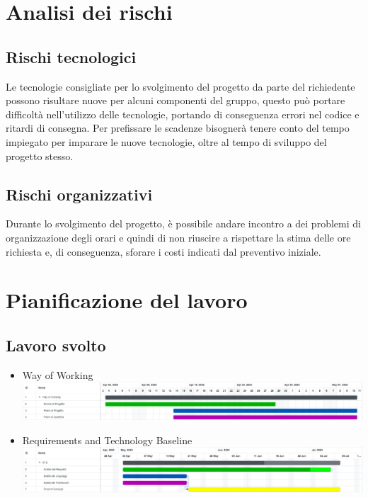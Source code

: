 \documentclass[a4paper, 12pt]{article}
\begin{document}
\makeindexdetails
\makefrontpage \makeversioni
\tableofcontents
\newpage
\clearpage
{} 

\section{Analisi dei rischi}

\subsection{Rischi tecnologici}
Le tecnologie consigliate per lo svolgimento del progetto da parte del richiedente possono risultare nuove per alcuni componenti del gruppo, questo può portare difficoltà nell'utilizzo delle tecnologie, portando di conseguenza errori nel codice e ritardi di consegna. \newline
Per prefissare le scadenze bisognerà tenere conto del tempo impiegato per imparare le nuove tecnologie, oltre al tempo di sviluppo del progetto stesso.

\subsection{Rischi organizzativi}
Durante lo svolgimento del progetto, è possibile andare incontro a dei problemi di organizzazione degli orari e quindi di non riuscire a rispettare la stima delle ore richiesta e, di conseguenza, sforare i costi indicati dal preventivo iniziale.
\newpage
\section{Pianificazione del lavoro}

\subsection{Lavoro svolto}



\begin{itemize}
    \item Way of Working\newline
    \includegraphics[scale=0.24]{WoW_2.png}\newline
    \item Requirements and Technology Baseline\newline
    \includegraphics[scale=0.24]{RTB_4.png}\newline
\end{itemize}
\end{document}
